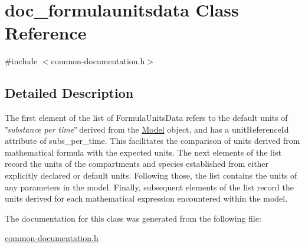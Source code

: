 \hypertarget{classdoc__formulaunitsdata}{}\section{doc\+\_\+formulaunitsdata Class Reference}
\label{classdoc__formulaunitsdata}


{\ttfamily \#include $<$common-\/documentation.\+h$>$}



\subsection{Detailed Description}
\begin{DoxyParagraph}{The first element of the list of Formula\+Units\+Data refers to the default}
units of {\itshape \char`\"{}substance per time\char`\"{}} derived from the \hyperlink{class_model}{Model} object, and has a {\ttfamily unit\+Reference\+Id} attribute of \textquotesingle{}subs\+\_\+per\+\_\+time\textquotesingle{}. This facilitates the comparison of units derived from mathematical formula with the expected units. The next elements of the list record the units of the compartments and species established from either explicitly declared or default units. Following those, the list contains the units of any parameters in the model. Finally, subsequent elements of the list record the units derived for each mathematical expression encountered within the model. 
\end{DoxyParagraph}


The documentation for this class was generated from the following file\+:\begin{DoxyCompactItemize}
\item 
\hyperlink{common-documentation_8h}{common-\/documentation.\+h}\end{DoxyCompactItemize}
